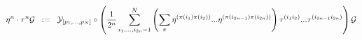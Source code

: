 \begin{equation}
\eta^n \cdot \tau^n {\cal{G}} \;\; :=\;\; {\cal{Y}}_{[ p_1 ,..., p_N ]} \circ \left( {1 \over 2^n} \sum_{i_1 ,..., i_{2n} =1}^{N} \left( \sum_\pi \eta^{( \pi ( i_1 ) \pi ( i_2 ))} ... \eta^{( \pi ( i_{2n-1} ) \pi ( i_{2n} ))} \right) \tau^{( i_1 i_2 )} ... \tau^{( i_{2n-1} i_{2n} )} \right) {\cal{G}}
\label{eq:x9}
\end{equation}

